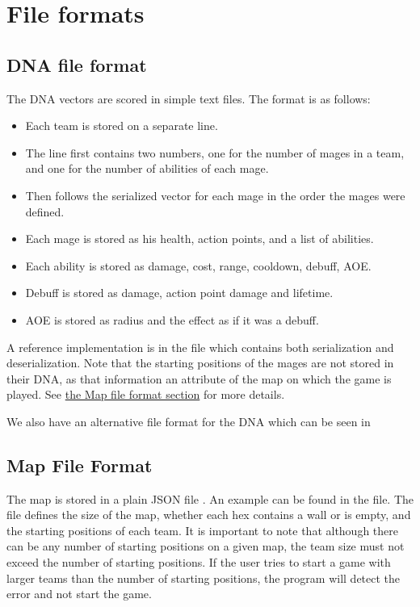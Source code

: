 
\chapter{File formats}
\label{file-formats}

\section{DNA file format}
\label{dna-format}

The DNA vectors are scored in simple text files. The format is as follows:

\begin{itemize}
	\item Each team is stored on a separate line.
	\item The line first contains two numbers, one for the number of mages in a team, and one for the number of abilities of each mage.
	\item Then follows the serialized vector for each mage in the order the mages were defined.
	\item Each mage is stored as his health, action points, and a list of abilities.
	\item Each ability is stored as damage, cost, range, cooldown, debuff, AOE.
	\item Debuff is stored as damage, action point damage and lifetime.
	\item AOE is stored as radius and the effect as if it was a debuff.
\end{itemize}

A reference implementation is in the  file which contains both serialization and deserialization. Note that the starting positions of the mages are not stored in their DNA, as that information an attribute of the map on which the game is played. See \hyperref[map-format]{the Map file format section} for more details.

We also have an alternative file format for the DNA which can be seen in

\section{Map File Format}
\label{map-format}

The map is stored in a plain JSON file \citep{json}. An example can be found in the  file. The file defines the size of the map, whether each hex contains a wall or is empty, and the starting positions of each team. It is important to note that although there can be any number of starting positions on a given map, the team size must not exceed the number of starting positions. If the user tries to start a game with larger teams than the number of starting positions, the program will detect the error and not start the game.

